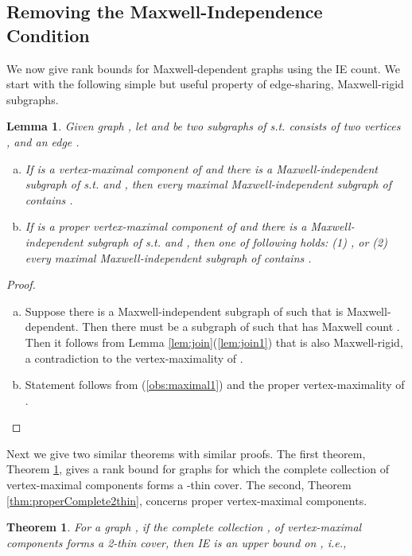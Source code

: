 \documentclass[10pt]{article}
\newtheorem{thm}{Theorem}
\newtheorem{lem}{Lemma}
\begin{document}
\subsection{Removing the Maxwell-Independence Condition}\label{sec:nonMaxwell}
We now give rank bounds for Maxwell-dependent graphs using the IE count. We start with the following simple but useful property of edge-sharing, Maxwell-rigid subgraphs.

\begin{lem}\label{obs:maximal}
Given graph , let  and  be two subgraphs of  s.t.    consists of two vertices ,  and an edge .
\begin{enumerate}[(a)]
\item\label{obs:maximal1} If  is a vertex-maximal component of  and there is a  Maxwell-independent subgraph  of  s.t.    and , then every maximal Maxwell-independent subgraph of  contains .
\item\label{obs:maximal2} If  is a proper vertex-maximal component of  and there is a  Maxwell-independent subgraph  of  s.t.    and , then one of following holds:
(1)     , or
(2) every maximal Maxwell-independent subgraph of  contains .
\end{enumerate}
\end{lem}
\begin{proof}
\begin{enumerate}[(a)]
\item Suppose there is a Maxwell-independent subgraph  of 
such that    is Maxwell-dependent. Then there must be a subgraph  of  such that  has Maxwell count . Then it follows from Lemma \ref{lem:join}(\ref{lem:join1}) that   is also Maxwell-rigid, a contradiction to the vertex-maximality of .
\item Statement follows from (\ref{obs:maximal1}) and the proper vertex-maximality of . 
\end{enumerate}
\end{proof}

Next we give two similar theorems with similar proofs. The first theorem, Theorem \ref{thm:complete2thin}, gives a rank bound for graphs for which the complete collection of vertex-maximal components forms a -thin cover. The second, Theorem \ref{thm:properComplete2thin}, concerns proper vertex-maximal components.

\begin{thm}\label{thm:complete2thin}
For a graph , if the complete collection    ,  of vertex-maximal components forms a 2-thin cover, then IE is an upper bound on , i.e.,  \end{thm}
\end{document}

